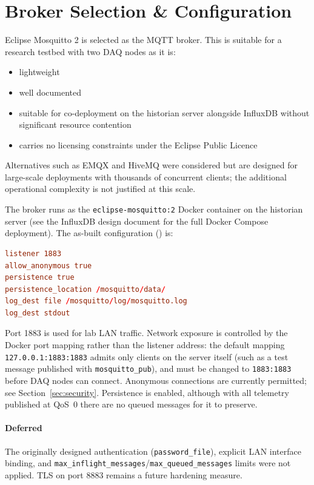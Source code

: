 \section{Broker Selection \& Configuration}

Eclipse Mosquitto 2 is selected as the MQTT broker. This is suitable for a research testbed with two DAQ nodes as it is:
\begin{itemize}[noitemsep]
  \item lightweight
  \item well documented
  \item suitable for co-deployment on the historian server alongside InfluxDB without significant resource contention
  \item carries no licensing constraints under the Eclipse Public Licence
\end{itemize}
Alternatives such as EMQX and HiveMQ were considered but are designed for large-scale deployments with thousands of concurrent clients; the additional operational complexity is not justified at this scale.

The broker runs as the \texttt{eclipse-mosquitto:2} Docker container on the historian server (see the InfluxDB design document for the full Docker Compose deployment). The as-built configuration () is:

\begin{lstlisting}[language=toml]
listener 1883
allow_anonymous true
persistence true
persistence_location /mosquitto/data/
log_dest file /mosquitto/log/mosquitto.log
log_dest stdout
\end{lstlisting}

Port 1883 is used for lab LAN traffic. Network exposure is controlled by the Docker port mapping rather than the listener address: the default mapping \texttt{127.0.0.1:1883:1883} admits only clients on the server itself (such as a test message published with \texttt{mosquitto\_pub}), and must be changed to \texttt{1883:1883} before DAQ nodes can connect. Anonymous connections are currently permitted; see Section~\ref{sec:security}. Persistence is enabled, although with all telemetry published at QoS~0 there are no queued messages for it to preserve.

\paragraph{Deferred} The originally designed authentication (\texttt{password\_file}), explicit LAN interface binding, and \texttt{max\_inflight\_messages}/\texttt{max\_queued\_messages} limits were not applied. TLS on port 8883 remains a future hardening measure.
